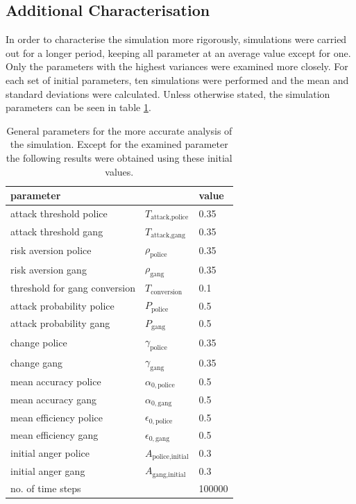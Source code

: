 \documentclass[11pt]{article}
\begin{document}
\newpage
\subsection{Additional Characterisation}
In order to characterise the simulation more rigorously, simulations were carried out for a longer period, keeping all parameter at an average value except for one. Only the parameters with the highest variances were examined more closely. For each set of initial parameters, ten simulations were performed and the mean and standard deviations were calculated. Unless otherwise stated, the simulation parameters can be seen in table \ref{parameters}.
\begin{table}
\centering
\begin{tabular}{lll}
\hline
parameter && value \\
\hline
attack threshold police  &$T_{\text{attack,police}}$ &0.35\\
attack threshold gang& $T_{\text{attack,gang}}$& 0.35\\
risk aversion police& $\rho_{\text{police}}$ &0.35\\
risk aversion gang& $\rho_{\text{gang}}$ &0.35\\
threshold for gang conversion \qquad & $T_{\text{conversion}}$ &0.1\\
attack probability police&  $P_{\text{police}}$ &0.5\\
attack probability gang&  $P_{\text{gang}}$ &0.5\\
change police& $\gamma_{\text{police}}$ &0.35\\
change gang &$\gamma_{\text{gang}}$& 0.35\\
mean accuracy police &$\alpha_{0,\text{police}}$ &0.5\\
mean accuracy gang &$\alpha_{0,\text{gang}}$ &0.5\\
mean efficiency police& $\epsilon_{0,\text{police}}$ &0.5\\
mean efficiency gang &$\epsilon_{0,\text{gang}}$ &0.5\\
initial anger police &$A_{\text{police,initial}}$ &0.3\\
initial anger gang &$A_{\text{gang,initial}}$ &0.3\\
no. of time steps && 100000
\end{tabular}
\caption{General parameters for the more accurate analysis of the simulation. Except for the examined parameter the following results were obtained using these initial values.}\label{parameters}
\end{table}
\end{document}
